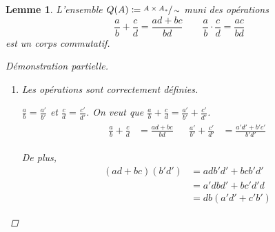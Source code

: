 \documentclass{report}
\newtheorem*{lem}{Lemme}
\theoremstyle{definition}
\theoremstyle{remark}
\begin{document}
	\begin{lem}
		L'ensemble $Q(A) \coloneq \sfrac{A\times A_*}{\sim}$ muni des op\'erations
		\[ \frac{a}{b}+\frac{c}{d}=\frac{ad+bc}{bd} \qquad \frac{a}{b} \cdot \frac{c}{d}=\frac{ac}{bd} \]
		est un corps commutatif.
		\begin{proof}[D\'emonstration partielle]~

			\begin{enumerate}
				\item Les op\'erations sont correctement d\'efinies.

				$\frac{a}{b}=\frac{a'}{b'}$ et $\frac{c}{d}=\frac{c'}{d'}$. On veut que $\frac{a}{b}+\frac{c}{d}=\frac{a'}{b'}+\frac{c'}{d'}$.
				\begin{align*}
					\begin{split}
						\frac{a}{b}+\frac{c}{d}&= \frac{ad+bc}{bd}
					\end{split}
					&
					\begin{split}
						\frac{a'}{b'}+\frac{c'}{d'}&= \frac{a'd'+b'c'}{b'd'}
					\end{split}
				\end{align*}

				De plus,
				\begin{align*}
					(ad+bc)(b'd')&= adb'd'+bcb'd'\\
					&= a'dbd'+bc'd'd\\
					&= db(a'd'+c'b')
				\end{align*}


\end{enumerate}
\end{proof}
\end{lem}
\end{document}
